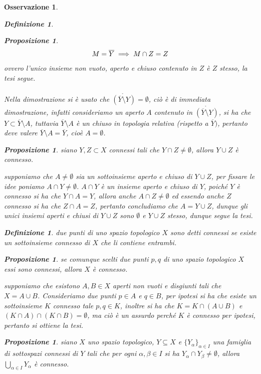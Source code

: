 \documentclass[oneside, 11pt]{amsbook}
\makeatletter
\newcommand{\0}{{(0)}}
\newcommand{\3}{{(3)}}
\theoremstyle{colonplain}
\newtheorem{prop}[thm]{Proposizione}
\theoremstyle{colondefinition}
\newtheorem{defn}[thm]{Definizione}
\theoremstyle{colonremark}
\newtheorem{rmk}[thm]{Osservazione}
\numberwithin{equation}{chapter}
\renewcommand{\proofname}{Dimostrazione}
\renewenvironment{proof}[1][\proofname]{\par
  \pushQED{\end{proof}}%
  \normalfont \topsep6\p@\@plus6\p@\relax
  \trivlist
  \item[\hskip\labelsep\bfseries #1:]\ignorespaces
}{%
  \popQED\endtrivlist\@endpefalse
}
\makeatother
\begin{document}
\begin{rmk}
\begin{defn}
\begin{prop}
\begin{proof}
\begin{align}
    M = \overline{Y} \implies M \cap Z = Z \notag
\end{align}
ovvero l'unico insieme non vuoto, aperto e chiuso contenuto in $Z$ è $Z$ stesso, la tesi segue. \\ \\
Nella dimostrazione si è usato che $\mathring{(\overline{Y} \setminus Y)} = \emptyset$, ciò è di immediata dimostrazione, infatti consideriamo un aperto $A$ contenuto in $\mathring{(\overline{Y} \setminus Y)}$, si ha che $Y \subset \overline{Y} \setminus A$, tuttavia $\overline{Y} \setminus A$ è un chiuso in topologia relativa (rispetto a $\overline{Y})$, pertanto deve valere $\overline{Y} \setminus A = \overline{Y}$, cioè $A = \emptyset$.
\end{proof}
\begin{prop}
siano $Y, Z \subset X$ connessi tali che $Y \cap Z \neq \emptyset$, allora $Y \cup Z$ è connesso.
\end{prop}
\begin{proof}
supponiamo che $A \neq \emptyset$ sia un sottoinsieme aperto e chiuso di $Y \cup Z$, per fissare le idee poniamo $A \cap Y \neq \emptyset$. $A \cap Y$ è un insieme aperto e chiuso di $Y$, poiché $Y$ è connesso si ha che $Y \cap A = Y$, allora anche $A \cap Z \neq \emptyset$ ed essendo anche $Z$ connesso si ha che $Z \cap A = Z$, pertanto concludiamo che $A = Y \cup Z$, dunque gli unici insiemi aperti e chiusi di $Y \cup Z$ sono $\emptyset$ e $Y \cup Z$ stesso, dunque segue la tesi.
\end{proof}
\begin{defn}
due punti di uno spazio topologico $X$ sono detti \textit{connessi} se esiste un sottoinsieme connesso di $X$ che li contiene entrambi.
\end{defn}
\begin{prop}
se comunque scelti due punti $p, q$ di uno spazio topologico $X$ essi sono connessi, allora $X$ è connesso.
\end{prop}
\begin{proof}
supponiamo che esistono $A, B \in X$ aperti non vuoti e disgiunti tali che $X = A \cup B$. Consideriamo due punti $p \in A$ e $q \in B$, per ipotesi si ha che esiste un sottoinsieme $K$ connesso tale $p, q \in K$, inoltre si ha che $K = K \cap (A \cup B)$ e $(K \cap A) \cap (K \cap B) = \emptyset$, ma ciò è un assurdo perché $K$ è connesso per ipotesi, pertanto si ottiene la tesi.
\end{proof}
\begin{prop}
siano $X$ uno spazio topologico, $Y \subseteq X$ e $\{ Y_\alpha \}_{\alpha \in I}$ una famiglia di sottospazi connessi di $Y$ tali che per ogni $\alpha, \beta \in I$ si ha $Y_\alpha \cap Y_\beta \neq \emptyset$, allora $\bigcup_{\alpha \in I} Y_\alpha$ è connesso.

\end{prop}
\end{prop}
\end{defn}
\end{rmk}
\end{document}
